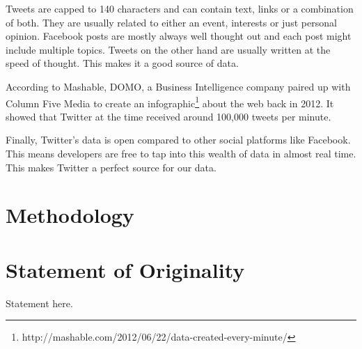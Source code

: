 Tweets are capped to 140 characters and can contain text, links or a combination of both. They are
usually related to either an event, interests or just personal opinion. Facebook posts are mostly
always well thought out and each post might include multiple topics. Tweets on the other hand are
usually written at the speed of thought. This makes it a good source of data.

According to Mashable, DOMO, a Business Intelligence company paired up with Column Five Media to
create an infographic\footnote{http://mashable.com/2012/06/22/data-created-every-minute/} about the
web back in 2012. It showed that Twitter at the time received around 100,000 tweets per minute.

Finally, Twitter's data is open compared to other social platforms like Facebook. This means
developers are free to tap into this wealth of data in almost real time. This makes Twitter a
perfect source for our data.

\section{Methodology}
\label{sec:methodology}

\section{Statement of Originality}

Statement here.

